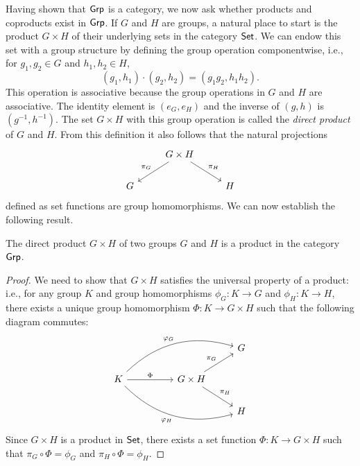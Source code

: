Having shown that \(\mathsf{Grp}\) is a category, we now ask whether products and
coproducts exist in \(\mathsf{Grp}\). If \(G\) and \(H\) are groups, a natural place to
start is the product \(G \times H\) of their underlying sets in the category
\(\mathsf{Set}\). We can endow this set with a group structure by defining the
group operation componentwise, i.e., for \(g_1, g_2 \in G\) and \(h_1, h_2 \in
H\),
\[
    (g_1, h_1) \cdot (g_2, h_2) = (g_1g_2, h_1h_2).
\]
This operation is associative because the group operations in \(G\) and \(H\)
are associative. The identity element is \((e_G, e_H)\) and the inverse of \((g,
h)\) is \((g^{-1}, h^{-1})\). The set \(G \times H\) with this group operation
is called the \emph{direct product} of \(G\) and \(H\). From this definition it
also follows that the natural projections
\[
        \begin{tikzcd}
            & G\times H \arrow[ld, "\pi_G"'] \arrow[rd, "\pi_H"] &   \\
          G &                                                    & H
          \end{tikzcd}
\]
defined as set functions are group homomorphisms. We can now establish the
following result.

\begin{theorem}
    The direct product \(G \times H\) of two groups \(G\) and \(H\) is a product
    in the category \(\mathsf{Grp}\).
\end{theorem}

\begin{proof}
    We need to show that \(G \times H\) satisfies the universal property of a
    product: i.e., for any group \(K\) and group homomorphisms \(\phi_G: K \to
    G\) and \(\phi_H: K \to H\), there exists a unique group homomorphism
    \(\Phi: K \to G \times H\) such that the following diagram commutes:
    \[
        \begin{tikzcd}
            &  &                                                    & G \\
        K \arrow[rr, "\Phi"] \arrow[rrru, "\phi_G", bend left] \arrow[rrrd, "\phi_H"', bend right] &  & G \times H \arrow[rd, "\pi_H"] \arrow[ru, "\pi_G"] &   \\
                    &  &                                                    & H
        \end{tikzcd}
    \]
    Since \(G \times H\) is a product in \(\mathsf{Set}\), there exists a set
    function \(\Phi: K \to G \times H\) such that \(\pi_G \circ \Phi = \phi_G\)
    and \(\pi_H \circ \Phi = \phi_H\). 
\end{proof}


